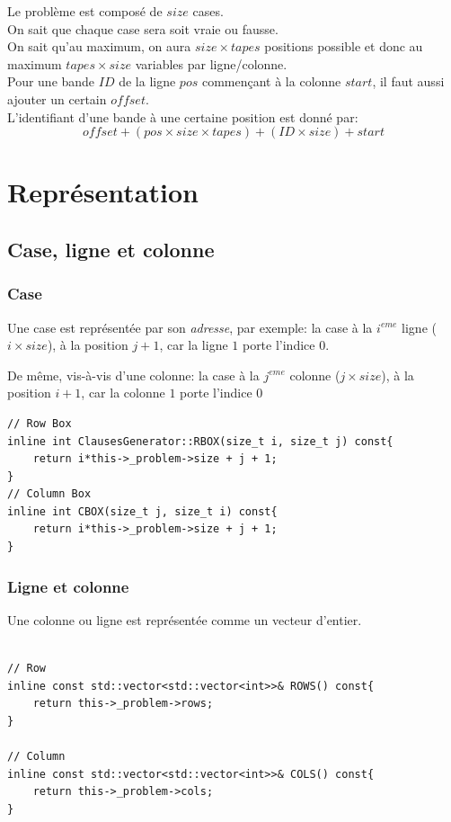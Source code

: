 \documentclass[a4paper,12pt]{report}
\begin{document}
Le problème est composé de $size$ cases.\\
On sait que chaque case sera soit vraie ou fausse.\\
On sait qu'au maximum, on aura $size \times tapes$ positions possible et donc au maximum $tapes\times size$ variables par ligne/colonne.\\
Pour une bande $ID$ de la ligne $pos$ commençant à la colonne $start$, il faut aussi ajouter un certain $offset$.\\

L'identifiant d'une bande à une certaine position est donné par:
$$offset+ (pos \times size \times tapes) + (ID \times size) + start$$


\section{Représentation}
\subsection{Case, ligne et colonne}
\subsubsection{Case}
Une case est représentée par son \textit{adresse}, par exemple: la case à la $i^{eme}$ ligne ($i\times size$), à la position $j+1$, car la ligne $1$ porte l'indice $0$.

De même, vis-à-vis d'une colonne: la case à la $j^{eme}$ colonne ($j\times size$), à la position $i+1$, car la colonne $1$ porte l'indice $0$
\lstset{style=Cpp, caption=Cases, label=C:Cases}
\begin{lstlisting}[mathescape=true]
// Row Box
inline int ClausesGenerator::RBOX(size_t i, size_t j) const{
	return i*this->_problem->size + j + 1;
}
// Column Box
inline int CBOX(size_t j, size_t i) const{
	return i*this->_problem->size + j + 1;
}
\end{lstlisting}


\subsubsection{Ligne et colonne}
Une colonne ou ligne est représentée comme un vecteur d'entier.
\lstset{style=Cpp, caption=Ligne et colonne, label=C:RowColumn}
\begin{lstlisting}[mathescape=true]

// Row
inline const std::vector<std::vector<int>>& ROWS() const{
	return this->_problem->rows;
}

// Column
inline const std::vector<std::vector<int>>& COLS() const{
	return this->_problem->cols;
}
\end{lstlisting}
\end{document}
